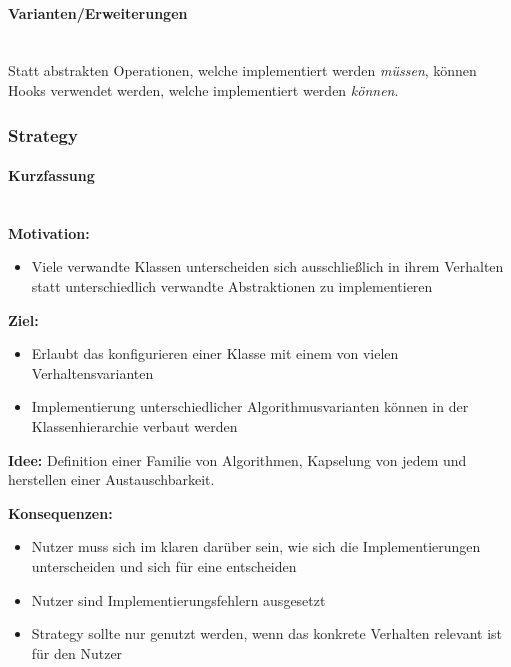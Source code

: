 \documentclass[
    ngerman,
    color=3b,
    summary,
    boxarc,
    main,
]{rubos-tuda-template}
\begin{document}
\paragraph{Varianten/Erweiterungen}\mbox{}\\
Statt abstrakten Operationen, welche implementiert werden \textit{müssen}, können Hooks verwendet werden, welche implementiert werden \textit{können}.

\clearpage
\subsubsection{Strategy}
\paragraph{Kurzfassung}\mbox{}\\
\textbf{Motivation:}
\begin{itemize}
    \item Viele verwandte Klassen unterscheiden sich ausschließlich in ihrem Verhalten statt unterschiedlich verwandte Abstraktionen zu implementieren
\end{itemize}

\textbf{Ziel:}
\begin{itemize}
    \item Erlaubt das konfigurieren einer Klasse mit einem von vielen Verhaltensvarianten
    \item Implementierung unterschiedlicher Algorithmusvarianten können in der Klassenhierarchie verbaut werden
\end{itemize}

\textbf{Idee:} Definition einer Familie von Algorithmen, Kapselung von jedem und herstellen einer Austauschbarkeit.

\textbf{Konsequenzen:}
\begin{itemize}
    \item Nutzer muss sich im klaren darüber sein, wie sich die Implementierungen unterscheiden und sich für eine entscheiden
    \item Nutzer sind Implementierungsfehlern ausgesetzt
    \item Strategy sollte nur genutzt werden, wenn das konkrete Verhalten relevant ist für den Nutzer
\end{itemize}
\end{document}

